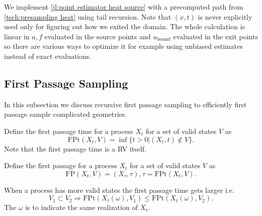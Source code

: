 \documentclass[a4paper,12pt]{article}
\begin{document}
\begin{julia}\label{jl:path point estimator heat source}
  We implement \ref{jl:point estimator heat source} with a precomputed path from \ref{tech:presampling heat} using tail
  recursion. Note that $(x,t)$ is
  never explicitly used only for figuring out how we exited the domain. The whole calculation is linear in
  $a,f$ evaluated in the source points and $u_\text{bound}$ evaluated in the exit points so there are various
  ways to optimize it for example using unbiased estimates instead of exact evaluations.

\end{julia}




\subsection{First Passage Sampling}

In this subsection we discuss recursive first passage sampling to efficiently
first passage sample complicated geometries.


\begin{definition} \label{def:first passage time}
  Define the first passage time for a process $X_{t}$ for a set of valid states
  $V$ as
  \begin{equation}
    \text{FPt}(X_{t},V)=\inf \{t>0| (X_{t},t) \notin V \}
    .
  \end{equation}
  Note that the first passage time is a RV itself.
\end{definition}

\begin{definition} \label{def:first passage}
  Define the first passage for a process $X_{t}$ for a set of valid states
  $V$ as
  \begin{equation}
    \text{FP}(X_{t},V)=(X_{\tau},\tau), \tau = \text{FPt}(X_{t},V)
    .
  \end{equation}
\end{definition}

\begin{lemma} \label{lem: FP order}
  When a process has more valid states the first passage time gets larger i.e.
  \begin{equation}
    V_{1} \subset V_{2} \Rightarrow
    \text{FPt}(X_{t}(\omega),V_{1}) \le  \text{FPt}(X_{t}(\omega),V_{2}) .
  \end{equation}
  The $\omega$ is to indicate the same realization of $X_{t}$.
\end{lemma}
\end{document}
